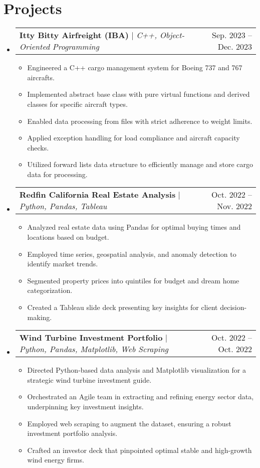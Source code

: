 \documentclass[letterpaper,11pt]{article}
\makeatletter
\newcommand{\resumeItem}[1]{\item\small{{#1 \vspace{-2pt}}}}
\newcommand{\resumeProjectHeading}[2]{\item\begin{tabular*}{0.97\textwidth}{l@{\extracolsep{\fill}}r}\small#1 & #2 \end{tabular*}\vspace{-7pt}}
\newcommand{\smallbullet}{\raisebox{0.3ex}{\scalebox{0.7}{$\bullet$}}} %
\newenvironment{resumeSubHeadingList}{\begin{itemize}[leftmargin=0.15in, label={}]}{\end{itemize}}
\newenvironment{resumeItemList}{\begin{itemize}[label=\smallbullet]}{\end{itemize}\vspace{-5pt}}
\makeatother
\begin{document}
    \section{Projects}
    \label{sec:projects}
    \begin{resumeSubHeadingList}
        \resumeProjectHeading
        {\textbf{Itty Bitty Airfreight (IBA)} $|$ \emph{C++, Object-Oriented Programming}}{Sep. 2023 -- Dec. 2023}
        \begin{resumeItemList}
            \resumeItem{Engineered a C++ cargo management system for Boeing 737 and 767 aircrafts.}
            \resumeItem{Implemented abstract base class with pure virtual functions and derived classes for specific aircraft types.}
            \resumeItem{Enabled data processing from files with strict adherence to weight limits.}
            \resumeItem{Applied exception handling for load compliance and aircraft capacity checks.}
            \resumeItem{Utilized forward lists data structure to efficiently manage and store cargo data for processing.}
        \end{resumeItemList}

        \resumeProjectHeading
        {\textbf{Redfin California Real Estate Analysis} $|$ \emph{Python, Pandas, Tableau}}{Oct. 2022 -- Nov. 2022}
        \begin{resumeItemList}
            \resumeItem{Analyzed real estate data using Pandas for optimal buying times and locations based on budget.}
            \resumeItem{Employed time series, geospatial analysis, and anomaly detection to identify market trends.}
            \resumeItem{Segmented property prices into quintiles for budget and dream home categorization.}
            \resumeItem{Created a Tableau slide deck presenting key insights for client decision-making.}
        \end{resumeItemList}



        \resumeProjectHeading
        {\textbf{Wind Turbine Investment Portfolio} $|$ \emph{Python, Pandas, Matplotlib, Web Scraping}}{Oct. 2022 -- Oct. 2022}
        \begin{resumeItemList}
            \resumeItem{Directed Python-based data analysis and Matplotlib visualization for a strategic wind turbine investment guide.}
            \resumeItem{Orchestrated an Agile team in extracting and refining energy sector data, underpinning key investment insights.}
            \resumeItem{Employed web scraping to augment the dataset, ensuring a robust investment portfolio analysis.}
            \resumeItem{Crafted an investor deck that pinpointed optimal stable and high-growth wind energy firms.}
        \end{resumeItemList}


\end{resumeSubHeadingList}
\end{document}
